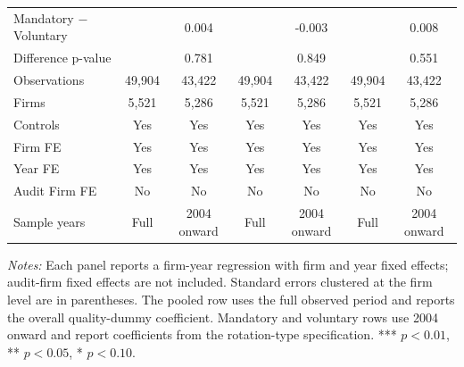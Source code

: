 \begin{table}[htbp]
\begin{threeparttable}
{\begin{tabular}{l cc cc cc}
Mandatory $-$ Voluntary &  & 0.004 &  & -0.003 &  & 0.008 \\
Difference p-value &  & 0.781 &  & 0.849 &  & 0.551 \\
Observations & 49,904 & 43,422 & 49,904 & 43,422 & 49,904 & 43,422 \\
Firms & 5,521 & 5,286 & 5,521 & 5,286 & 5,521 & 5,286 \\
\midrule
Controls & Yes & Yes & Yes & Yes & Yes & Yes \\
Firm FE & Yes & Yes & Yes & Yes & Yes & Yes \\
Year FE & Yes & Yes & Yes & Yes & Yes & Yes \\
Audit Firm FE & No & No & No & No & No & No \\
Sample years & Full & 2004 onward & Full & 2004 onward & Full & 2004 onward \\
\bottomrule
\end{tabular}}
\begin{tablenotes}\footnotesize
\item \textit{Notes:} Each panel reports a firm-year regression with firm and year fixed effects; audit-firm fixed effects are not included. Standard errors clustered at the firm level are in parentheses. The pooled row uses the full observed period and reports the overall quality-dummy coefficient. Mandatory and voluntary rows use 2004 onward and report coefficients from the rotation-type specification. *** \(p<0.01\), ** \(p<0.05\), * \(p<0.10\).
\end{tablenotes}
\end{threeparttable}
\end{table}
